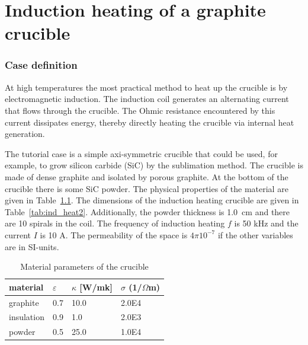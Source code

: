 \chapter{Induction heating of a graphite crucible}


\subsection*{Case definition}

At high temperatures the most practical 
method to heat up the crucible 
is by electromagnetic induction. 
The induction coil generates an alternating 
current that flows through the crucible. 
The Ohmic resistance encountered by this current dissipates 
energy, thereby directly
heating the crucible via internal heat generation.

The tutorial case is a simple axi-symmetric crucible that could be
used, for example, to grow silicon carbide (SiC) by the sublimation method.
The crucible 
is made of dense graphite and isolated by 
porous graphite. At the bottom of the crucible there is
some SiC powder. The physical properties of the 
material are given in Table~\ref{tab:ind_heat1}. The dimensions of the
induction heating crucible are given in Table~\ref{tab:ind_heat2}.
Additionally, the powder thickness is 1.0~cm and there are 10 spirals
in the coil.
The frequency of induction heating $f$ is 50 kHz and the current 
$I$ is 10 A.
The permeability of the space is $4\pi 10^{-7}$
if the other variables are in SI-units.

\begin{table}
\caption{Material parameters of the crucible}
\label{tab:ind_heat1}
\begin{center}
\begin{tabular}{llll} \hline
material & $\varepsilon$  & $\kappa$ [W/mk] & $\sigma$ (1/$\Omega$m) \\ \hline 
graphite  &      0.7   &          10.0  &          2.0E4 \\
insulation &      0.9   &          1.0   &          2.0E3  \\
powder    &      0.5   &          25.0  &          1.0E4 \\ \hline
\end{tabular}
\end{center}
\end{table}

